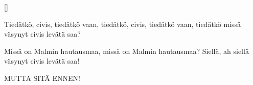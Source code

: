 
[]
  
\beginverse*
Tiedätkö, civis, tiedätkö vaan,
tiedätkö, civis, tiedätkö vaan,
tiedätkö missä väsynyt civis
levätä saa?
\endverse

\beginverse*
Missä on Malmin hautausmaa,
missä on Malmin hautausmaa?
Siellä, ah siellä väsynyt civis
levätä saa!
\endverse

\beginverse*
MUTTA SITÄ ENNEN!
\endverse
\endsong
